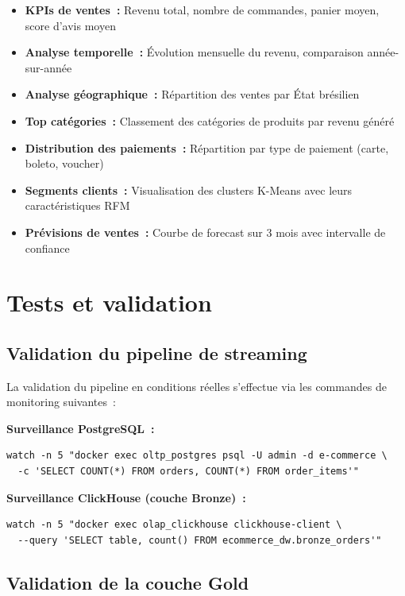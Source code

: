 \begin{itemize}
  \setlength{\itemsep}{0.4em}
  \item \textbf{KPIs de ventes~:} Revenu total, nombre de commandes, panier moyen, score d'avis moyen
  \item \textbf{Analyse temporelle~:} Évolution mensuelle du revenu, comparaison année-sur-année
  \item \textbf{Analyse géographique~:} Répartition des ventes par État brésilien
  \item \textbf{Top catégories~:} Classement des catégories de produits par revenu généré
  \item \textbf{Distribution des paiements~:} Répartition par type de paiement (carte, boleto, voucher)
  \item \textbf{Segments clients~:} Visualisation des clusters K-Means avec leurs caractéristiques RFM
  \item \textbf{Prévisions de ventes~:} Courbe de forecast sur 3 mois avec intervalle de confiance
\end{itemize}

\section{Tests et validation}

\subsection{Validation du pipeline de streaming}

La validation du pipeline en conditions réelles s'effectue via les commandes de monitoring suivantes~:

\textbf{Surveillance PostgreSQL~:}
\begin{verbatim}
watch -n 5 "docker exec oltp_postgres psql -U admin -d e-commerce \
  -c 'SELECT COUNT(*) FROM orders, COUNT(*) FROM order_items'"
\end{verbatim}

\textbf{Surveillance ClickHouse (couche Bronze)~:}
\begin{verbatim}
watch -n 5 "docker exec olap_clickhouse clickhouse-client \
  --query 'SELECT table, count() FROM ecommerce_dw.bronze_orders'"
\end{verbatim}

\subsection{Validation de la couche Gold}

